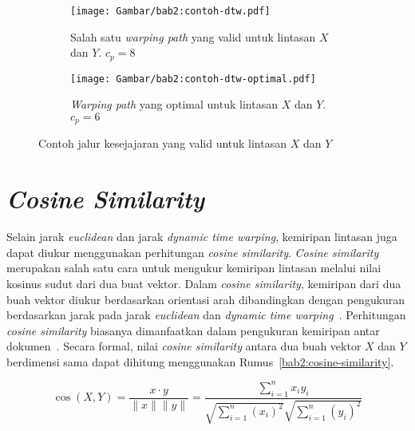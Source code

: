 \begin{figure}[htbp]
    \centering
    \begin{subfigure}{0.225\textwidth}
        \centering
        \texttt{[image: Gambar/bab2:contoh-dtw.pdf]}
        \caption{Salah satu \textit{warping path} yang valid untuk lintasan $X$ dan $Y$. $c_p = 8$}
        \label{bab2:warping-path}
    \end{subfigure} \hspace{0.5cm}
    \begin{subfigure}{0.225\textwidth}
        \centering
        \texttt{[image: Gambar/bab2:contoh-dtw-optimal.pdf]}
        \caption{\textit{Warping path} yang optimal untuk lintasan $X$ dan $Y$. $c_p = 6$}
        \label{bab2:warping-path-optimal}
    \end{subfigure}
    \caption{Contoh jalur kesejajaran yang valid untuk lintasan $X$ dan $Y$}
    \label{bab2:contoh-dtw}
\end{figure}

\section{\textit{Cosine Similarity}}

Selain jarak \textit{euclidean} dan jarak \textit{dynamic time warping}, kemiripan lintasan juga dapat diukur menggunakan perhitungan \textit{cosine similarity}. \textit{Cosine similarity} merupakan salah satu cara untuk mengukur kemiripan lintasan melalui nilai kosinus sudut dari dua buat vektor. Dalam \textit{cosine similarity}, kemiripan dari dua buah vektor diukur berdasarkan orientasi arah dibandingkan dengan pengukuran berdasarkan jarak pada jarak \textit{euclidean} dan \textit{dynamic time warping}~\cite{sitikhu:cosine-similarity}. Perhitungan \textit{cosine similarity} biasanya dimanfaatkan dalam pengukuran kemiripan antar dokumen~\cite{sitikhu:cosine-similarity}. Secara formal, nilai \textit{cosine similarity} antara dua buah vektor $X$ dan $Y$ berdimensi sama dapat dihitung menggunakan Rumus~\ref{bab2:cosine-similarity}.

\begin{equation}
    \cos (X, Y)= \frac{x \cdot y}{\|x\| \|y\|} = \frac{ \sum_{i=1}^{n}{x_i y_i}}{ \sqrt{\sum_{i=1}^{n}{(x_i)^2}} \sqrt{\sum_{i=1}^{n}{( y_i)^2}} }
    \label{bab2:cosine-similarity}
\end{equation}

\vspace{10pt}

